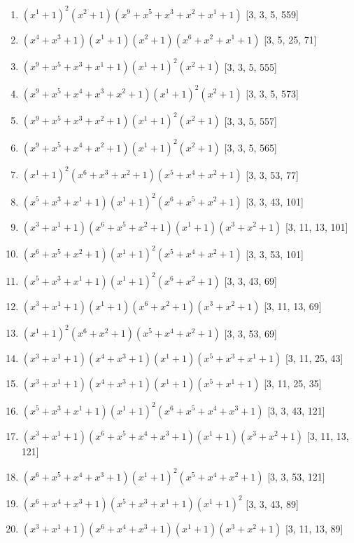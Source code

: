 \documentclass[10pt,twocolumn]{article}
\begin{document}
\begin{enumerate}
\item $(x^{1} + 1)^{2}(x^{2} + 1)(x^{9} + x^{5} + x^{3} + x^{2} + x^{1} + 1)$  [3, 3, 5, 559]
\item $(x^{4} + x^{3} + 1)(x^{1} + 1)(x^{2} + 1)(x^{6} + x^{2} + x^{1} + 1)$  [3, 5, 25, 71]
\item $(x^{9} + x^{5} + x^{3} + x^{1} + 1)(x^{1} + 1)^{2}(x^{2} + 1)$  [3, 3, 5, 555]
\item $(x^{9} + x^{5} + x^{4} + x^{3} + x^{2} + 1)(x^{1} + 1)^{2}(x^{2} + 1)$  [3, 3, 5, 573]
\item $(x^{9} + x^{5} + x^{3} + x^{2} + 1)(x^{1} + 1)^{2}(x^{2} + 1)$  [3, 3, 5, 557]
\item $(x^{9} + x^{5} + x^{4} + x^{2} + 1)(x^{1} + 1)^{2}(x^{2} + 1)$  [3, 3, 5, 565]
\item $(x^{1} + 1)^{2}(x^{6} + x^{3} + x^{2} + 1)(x^{5} + x^{4} + x^{2} + 1)$  [3, 3, 53, 77]
\item $(x^{5} + x^{3} + x^{1} + 1)(x^{1} + 1)^{2}(x^{6} + x^{5} + x^{2} + 1)$  [3, 3, 43, 101]
\item $(x^{3} + x^{1} + 1)(x^{6} + x^{5} + x^{2} + 1)(x^{1} + 1)(x^{3} + x^{2} + 1)$  [3, 11, 13, 101]
\item $(x^{6} + x^{5} + x^{2} + 1)(x^{1} + 1)^{2}(x^{5} + x^{4} + x^{2} + 1)$  [3, 3, 53, 101]
\item $(x^{5} + x^{3} + x^{1} + 1)(x^{1} + 1)^{2}(x^{6} + x^{2} + 1)$  [3, 3, 43, 69]
\item $(x^{3} + x^{1} + 1)(x^{1} + 1)(x^{6} + x^{2} + 1)(x^{3} + x^{2} + 1)$  [3, 11, 13, 69]
\item $(x^{1} + 1)^{2}(x^{6} + x^{2} + 1)(x^{5} + x^{4} + x^{2} + 1)$  [3, 3, 53, 69]
\item $(x^{3} + x^{1} + 1)(x^{4} + x^{3} + 1)(x^{1} + 1)(x^{5} + x^{3} + x^{1} + 1)$  [3, 11, 25, 43]
\item $(x^{3} + x^{1} + 1)(x^{4} + x^{3} + 1)(x^{1} + 1)(x^{5} + x^{1} + 1)$  [3, 11, 25, 35]
\item $(x^{5} + x^{3} + x^{1} + 1)(x^{1} + 1)^{2}(x^{6} + x^{5} + x^{4} + x^{3} + 1)$  [3, 3, 43, 121]
\item $(x^{3} + x^{1} + 1)(x^{6} + x^{5} + x^{4} + x^{3} + 1)(x^{1} + 1)(x^{3} + x^{2} + 1)$  [3, 11, 13, 121]
\item $(x^{6} + x^{5} + x^{4} + x^{3} + 1)(x^{1} + 1)^{2}(x^{5} + x^{4} + x^{2} + 1)$  [3, 3, 53, 121]
\item $(x^{6} + x^{4} + x^{3} + 1)(x^{5} + x^{3} + x^{1} + 1)(x^{1} + 1)^{2}$  [3, 3, 43, 89]
\item $(x^{3} + x^{1} + 1)(x^{6} + x^{4} + x^{3} + 1)(x^{1} + 1)(x^{3} + x^{2} + 1)$  [3, 11, 13, 89]

\end{enumerate}
\end{document}
